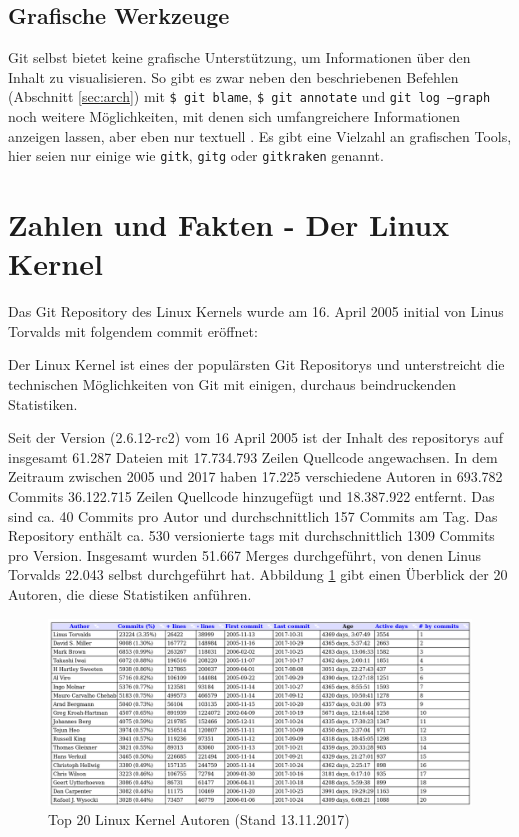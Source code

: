 \subsection{Grafische Werkzeuge}
Git selbst bietet keine grafische Unterstützung, um Informationen über den
Inhalt zu visualisieren. So gibt es zwar neben den beschriebenen Befehlen
(Abschnitt \ref{sec:arch}) mit \texttt{\$ git blame}, \texttt{\$ git annotate}
und \texttt{git log --graph} noch weitere Möglichkeiten, mit denen sich
umfangreichere Informationen anzeigen lassen, aber eben nur textuell
\cite[S.~302]{gitwf}. Es gibt eine Vielzahl an grafischen Tools, hier seien nur
einige wie \texttt{gitk}, \texttt{gitg} oder \texttt{gitkraken} genannt.

\section{Zahlen und Fakten - Der Linux Kernel}\label{sec:kernel}
Das Git Repository des Linux Kernels wurde am 16. April 2005 initial von Linus
Torvalds mit folgendem \gls{commit} \cite{link:linuxgit} eröffnet:


Der Linux Kernel ist eines der populärsten Git Repositorys und unterstreicht
die technischen Möglichkeiten von Git mit einigen, durchaus beindruckenden
Statistiken.

Seit der Version (2.6.12-rc2) vom 16 April 2005 ist der Inhalt des
\glspl{repository} auf insgesamt 61.287 Dateien mit 17.734.793 Zeilen Quellcode
angewachsen. In dem Zeitraum zwischen 2005 und 2017 haben 17.225 verschiedene
Autoren in 693.782 Commits 36.122.715 Zeilen Quellcode hinzugefügt und
18.387.922 entfernt. Das sind ca. 40 Commits pro Autor und durchschnittlich
157 Commits am Tag. Das Repository enthält ca. 530 versionierte \glspl{tag}
mit durchschnittlich 1309 Commits pro Version. Insgesamt wurden
51.667 Merges durchgeführt, von denen Linus Torvalds 22.043 selbst durchgeführt
hat. Abbildung \ref{top20} gibt einen Überblick der 20 Autoren, die diese
Statistiken anführen.

\begin{figure}
	\centering
  \includegraphics[scale=0.40]{images/top_20_of_linux_authors.png}
	\caption{Top 20 Linux Kernel Autoren (Stand 13.11.2017)}
	\label{top20}
\end{figure}

